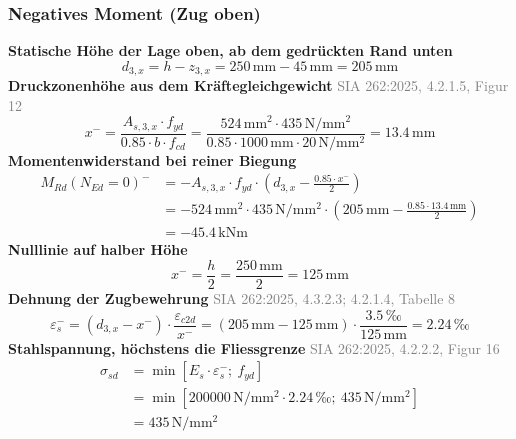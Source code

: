 \documentclass[11pt,a4paper]{article}
\newcommand{\normref}[1]{{\small\textcolor{gray}{#1}}}
\begin{document}
\subsubsection{Negatives Moment (Zug oben)}
\noindent\textbf{Statische Höhe der Lage oben, ab dem gedrückten Rand unten}
\begin{equation*}
d_{3,x} = h - z_{3,x} = 250\,\mathrm{mm} - 45\,\mathrm{mm} = 205\,\mathrm{mm}
\end{equation*}
\noindent\textbf{Druckzonenhöhe aus dem Kräftegleichgewicht} \hfill \normref{SIA 262:2025, 4.2.1.5, Figur 12}
\begin{equation*}
x^{-} = \frac{A_{s,3,x} \cdot f_{yd}}{0.85 \cdot b \cdot f_{cd}} = \frac{524\,\mathrm{mm}^{2} \cdot 435\,\mathrm{N}/\mathrm{mm}^{2}}{0.85 \cdot 1000\,\mathrm{mm} \cdot 20\,\mathrm{N}/\mathrm{mm}^{2}} = 13.4\,\mathrm{mm}
\end{equation*}
\noindent\textbf{Momentenwiderstand bei reiner Biegung}
\begin{equation*}
\begin{aligned}
  M_{Rd}(N_{Ed}=0)^{-} &= -A_{s,3,x} \cdot f_{yd} \cdot \left(d_{3,x} - \frac{0.85 \cdot x^{-}}{2}\right) \\
  &= -524\,\mathrm{mm}^{2} \cdot 435\,\mathrm{N}/\mathrm{mm}^{2} \cdot \left(205\,\mathrm{mm} - \frac{0.85 \cdot 13.4\,\mathrm{mm}}{2}\right) \\
  &= -45.4\,\mathrm{kNm}
\end{aligned}
\end{equation*}
\noindent\textbf{Nulllinie auf halber Höhe}
\begin{equation*}
x^{-} = \frac{h}{2} = \frac{250\,\mathrm{mm}}{2} = 125\,\mathrm{mm}
\end{equation*}
\noindent\textbf{Dehnung der Zugbewehrung} \hfill \normref{SIA 262:2025, 4.3.2.3; 4.2.1.4, Tabelle 8}
\begin{equation*}
\varepsilon_s^{-} = \left(d_{3,x} - x^{-}\right) \cdot \frac{\varepsilon_{c2d}}{x^{-}} = \left(205\,\mathrm{mm} - 125\,\mathrm{mm}\right) \cdot \frac{3.5\,\text{‰}}{125\,\mathrm{mm}} = 2.24\,\text{‰}
\end{equation*}
\noindent\textbf{Stahlspannung, höchstens die Fliessgrenze} \hfill \normref{SIA 262:2025, 4.2.2.2, Figur 16}
\begin{equation*}
\begin{aligned}
  \sigma_{sd} &= \min\left[E_s \cdot \varepsilon_s^{-};\ f_{yd}\right] \\
  &= \min\left[200000\,\mathrm{N}/\mathrm{mm}^{2} \cdot 2.24\,\text{‰};\ 435\,\mathrm{N}/\mathrm{mm}^{2}\right] \\
  &= 435\,\mathrm{N}/\mathrm{mm}^{2}
\end{aligned}
\end{equation*}
\end{document}
